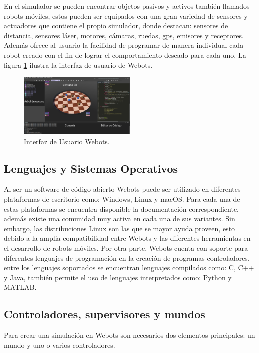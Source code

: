 En el simulador se pueden encontrar objetos pasivos y activos también llamados robots móviles, estos pueden ser equipados con una gran variedad de sensores y actuadores que contiene el propio simulador, donde destacan: sensores de distancia, sensores láser, motores, cámaras, ruedas, gps, emisores y receptores. Además ofrece al usuario la facilidad de programar de manera individual cada robot creado con el fin de lograr el comportamiento deseado para cada uno. La figura \ref{fig:webots_ui} ilustra la interfaz de usuario de Webots.
\begin{figure}
    \centering
    \includegraphics[width=0.5\textwidth]{Figures/Figures_Cap03/WebotsUserInterface.png}
    \caption{Interfaz de Usuario Webots.}
    \label{fig:webots_ui}
\end{figure}

\subsection{Lenguajes y Sistemas Operativos}

Al ser un software de código abierto Webots puede ser utilizado en diferentes plataformas de escritorio como: Windows, Linux y macOS. Para cada una de estas plataformas se encuentra disponible la documentación correspondiente, además existe una comunidad muy activa en cada una de sus variantes. Sin embargo, las distribuciones Linux son las que se mayor ayuda proveen, esto debido a la amplia compatibilidad entre Webots y las diferentes herramientas en el desarrollo de robots móviles. Por otra parte, Webots cuenta con soporte para diferentes lenguajes de programación en la creación de programas controladores, entre los lenguajes soportados se encuentran lenguajes compilados como: C, C++ y Java, también permite el uso de lenguajes interpretados como: Python y MATLAB\cite{Webots}.

\subsection{Controladores, supervisores y mundos} 

Para crear una simulación en Webots son necesarios dos elementos principales: un mundo y uno o varios controladores.

